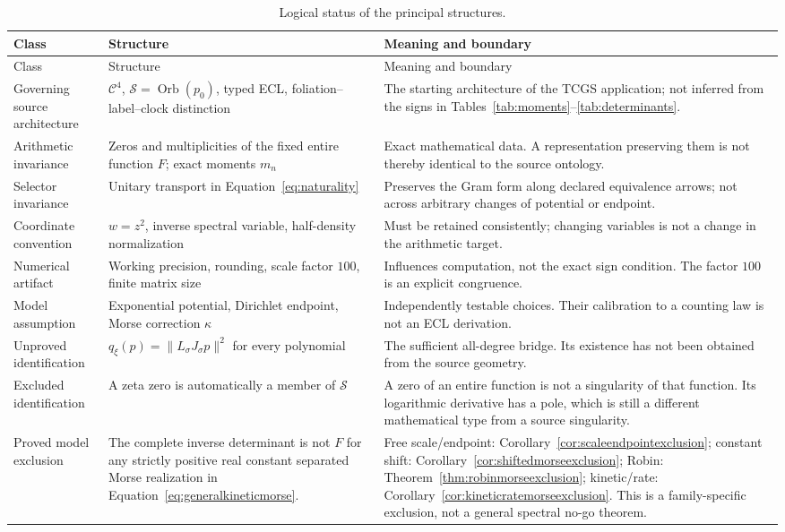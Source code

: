 \documentclass[11pt,letterpaper]{article}
\numberwithin{equation}{section}
\theoremstyle{definition}
\theoremstyle{remark}
\newcommand{\CS}{\mathcal C}
\DeclareMathOperator{\Orb}{Orb}
\begin{document}
\begin{longtable}{P{0.17\textwidth}P{0.35\textwidth}P{0.40\textwidth}}
\caption{Logical status of the principal structures.}\label{tab:types}\\
\toprule
Class & Structure & Meaning and boundary\\
\midrule
\endfirsthead
\toprule
Class & Structure & Meaning and boundary\\
\midrule
\endhead
Governing source architecture & $\CS^4$, $\mathcal S=\Orb(p_0)$, typed ECL, foliation--label--clock distinction & The starting architecture of the TCGS application; not inferred from the signs in Tables~\ref{tab:moments}--\ref{tab:determinants}.\\[0.5em]
Arithmetic invariance & Zeros and multiplicities of the fixed entire function $F$; exact moments $m_n$ & Exact mathematical data. A representation preserving them is not thereby identical to the source ontology.\\[0.5em]
Selector invariance & Unitary transport in Equation~\eqref{eq:naturality} & Preserves the Gram form along declared equivalence arrows; not across arbitrary changes of potential or endpoint.\\[0.5em]
Coordinate convention & $w=z^2$, inverse spectral variable, half-density normalization & Must be retained consistently; changing variables is not a change in the arithmetic target.\\[0.5em]
Numerical artifact & Working precision, rounding, scale factor $100$, finite matrix size & Influences computation, not the exact sign condition. The factor $100$ is an explicit congruence.\\[0.5em]
Model assumption & Exponential potential, Dirichlet endpoint, Morse correction $\kappa$ & Independently testable choices. Their calibration to a counting law is not an ECL derivation.\\[0.5em]
Unproved identification & $q_\xi(p)=\|L_\sigma J_\sigma p\|^2$ for every polynomial & The sufficient all-degree bridge. Its existence has not been obtained from the source geometry.\\[0.5em]
Excluded identification & A zeta zero is automatically a member of $\mathcal S$ & A zero of an entire function is not a singularity of that function. Its logarithmic derivative has a pole, which is still a different mathematical type from a source singularity.\\[0.5em]
Proved model exclusion & The complete inverse determinant is not $F$ for any strictly positive real constant separated Morse realization in Equation~\eqref{eq:generalkineticmorse}. & Free scale/endpoint: Corollary~\ref{cor:scaleendpointexclusion}; constant shift: Corollary~\ref{cor:shiftedmorseexclusion}; Robin: Theorem~\ref{thm:robinmorseexclusion}; kinetic/rate: Corollary~\ref{cor:kineticratemorseexclusion}. This is a family-specific exclusion, not a general spectral no-go theorem.\\
\bottomrule
\end{longtable}
\end{document}
